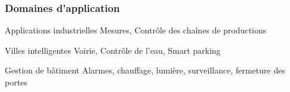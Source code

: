 \begin{frame}\frametitle{Domaines d'application}

    \begin{block}{Applications industrielles}
      Mesures, Contrôle des chaînes de productions
    \end{block}
  
    \begin{block}{Villes intelligentes}
      Voirie, Contrôle de l'eau, Smart parking
    \end{block}
  
    \begin{block}{Gestion de bâtiment}
      Alarmes, chauffage, lumière, surveillance, fermeture des portes
    \end{block}
  

  
\end{frame}

